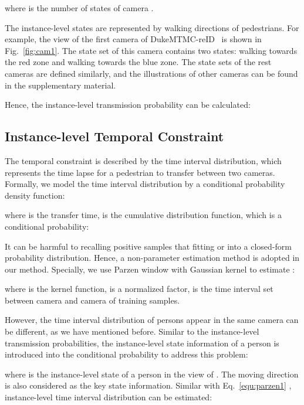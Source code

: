 \documentclass[10pt,twocolumn,letterpaper]{article}
\begin{document}
where  is the number of states of camera .

The instance-level states are represented by walking directions of pedestrians. 
For example, the view of the first camera of DukeMTMC-reID~\cite{Ergys2016Performance} is shown in Fig.~\ref{fig:cam1}. The state set of this camera contains two states: walking towards the red zone and walking towards the blue zone. The state sets of the rest cameras are defined similarly, and the illustrations of other cameras can be found in the supplementary material.

Hence, the instance-level transmission probability can be calculated: 






\subsection{Instance-level Temporal Constraint}

The temporal constraint is described by the time interval distribution, which represents the time lapse for a pedestrian to transfer between two cameras. Formally, we model the time interval distribution by a conditional probability density function:

where  is the transfer time,   is the cumulative distribution function, which is a conditional probability:



It can be harmful to recalling positive samples that fitting  or  into a closed-form probability distribution.
Hence, a non-parameter estimation method is adopted in our method. Specially, we use Parzen window with Gaussian kernel to estimate :



where  is the kernel function,  is a normalized factor,  is the time interval set between camera  and camera  of training samples.


However, the time interval distribution of persons appear in the same camera can be different, as we have mentioned before. Similar to the instance-level transmission probabilities, the instance-level state information of a person is introduced into the conditional probability to address this problem:


where  is the instance-level state of a person in the view of . The moving direction is also considered as the key state information.
Similar with Eq.~\ref{equ:parzen1} , instance-level time interval distribution  can be estimated:
\end{document}
